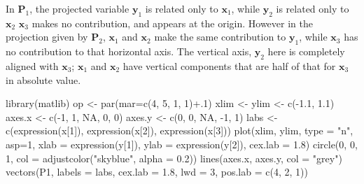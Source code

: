 \documentclass[
  letterpaper,
  10pt,
  krantz2]{krantz}
\makeatletter
\newenvironment{Shaded}{\begin{snugshade}}{\end{snugshade}}
\newcommand{\AttributeTok}[1]{\textcolor[rgb]{0.40,0.45,0.13}{#1}}
\newcommand{\ConstantTok}[1]{\textcolor[rgb]{0.56,0.35,0.01}{#1}}
\newcommand{\DecValTok}[1]{\textcolor[rgb]{0.68,0.00,0.00}{#1}}
\newcommand{\FloatTok}[1]{\textcolor[rgb]{0.68,0.00,0.00}{#1}}
\newcommand{\FunctionTok}[1]{\textcolor[rgb]{0.28,0.35,0.67}{#1}}
\newcommand{\NormalTok}[1]{\textcolor[rgb]{0.00,0.23,0.31}{#1}}
\newcommand{\OtherTok}[1]{\textcolor[rgb]{0.00,0.23,0.31}{#1}}
\newcommand{\SpecialCharTok}[1]{\textcolor[rgb]{0.37,0.37,0.37}{#1}}
\newcommand{\StringTok}[1]{\textcolor[rgb]{0.13,0.47,0.30}{#1}}
\newenvironment{kframe}{%
  \medskip{}
  \setlength{\fboxsep}{.8em}
  \def\at@end@of@kframe{}%
  \ifinner\ifhmode%
  \def\at@end@of@kframe{\end{minipage}}%
  \begin{minipage}{\columnwidth}%
  \fi\fi%
  \def\FrameCommand##1{\hskip\@totalleftmargin \hskip-\fboxsep
  \colorbox{shadecolor}{##1}\hskip-\fboxsep
      \hskip-\linewidth \hskip-\@totalleftmargin \hskip\columnwidth}%
  \MakeFramed {\advance\hsize-\width
    \@totalleftmargin\z@ \linewidth\hsize
    \@setminipage}}%
{\par\unskip\endMakeFramed%
  \at@end@of@kframe}
\renewenvironment{Shaded}{\begin{kframe}}{\end{kframe}}
\makeatother
\begin{document}
In \(\mathbf{P}_1\), the projected variable \(\mathbf{y}_1\) is related
only to \(\mathbf{x}_1\), while \(\mathbf{y}_2\) is related only to
\(\mathbf{x}_2\) \(\mathbf{x}_3\) makes no contribution, and appears at
the origin. However in the projection given by \(\mathbf{P}_2\),
\(\mathbf{x}_1\) and \(\mathbf{x}_2\) make the same contribution to
\(\mathbf{y}_1\), while \(\mathbf{x}_3\) has no contribution to that
horizontal axis. The vertical axis, \(\mathbf{y}_2\) here is completely
aligned with \(\mathbf{x}_3\); \(\mathbf{x}_1\) and \(\mathbf{x}_2\)
have vertical components that are half of that for \(\mathbf{x}_3\) in
absolute value.

\begin{Shaded}
\begin{Highlighting}[]
\FunctionTok{library}\NormalTok{(matlib)}
\NormalTok{op }\OtherTok{\textless{}{-}} \FunctionTok{par}\NormalTok{(}\AttributeTok{mar=}\FunctionTok{c}\NormalTok{(}\DecValTok{4}\NormalTok{, }\DecValTok{5}\NormalTok{, }\DecValTok{1}\NormalTok{, }\DecValTok{1}\NormalTok{)}\SpecialCharTok{+}\NormalTok{.}\DecValTok{1}\NormalTok{)}
\NormalTok{xlim }\OtherTok{\textless{}{-}}\NormalTok{ ylim }\OtherTok{\textless{}{-}} \FunctionTok{c}\NormalTok{(}\SpecialCharTok{{-}}\FloatTok{1.1}\NormalTok{, }\FloatTok{1.1}\NormalTok{)}
\NormalTok{axes.x }\OtherTok{\textless{}{-}} \FunctionTok{c}\NormalTok{(}\SpecialCharTok{{-}}\DecValTok{1}\NormalTok{, }\DecValTok{1}\NormalTok{, }\ConstantTok{NA}\NormalTok{, }\DecValTok{0}\NormalTok{, }\DecValTok{0}\NormalTok{)}
\NormalTok{axes.y }\OtherTok{\textless{}{-}} \FunctionTok{c}\NormalTok{(}\DecValTok{0}\NormalTok{, }\DecValTok{0}\NormalTok{, }\ConstantTok{NA}\NormalTok{, }\SpecialCharTok{{-}}\DecValTok{1}\NormalTok{, }\DecValTok{1}\NormalTok{)}
\NormalTok{labs }\OtherTok{\textless{}{-}} \FunctionTok{c}\NormalTok{(}\FunctionTok{expression}\NormalTok{(x[}\DecValTok{1}\NormalTok{]), }\FunctionTok{expression}\NormalTok{(x[}\DecValTok{2}\NormalTok{]), }\FunctionTok{expression}\NormalTok{(x[}\DecValTok{3}\NormalTok{]))}
\FunctionTok{plot}\NormalTok{(xlim, ylim, }\AttributeTok{type =} \StringTok{"n"}\NormalTok{, }\AttributeTok{asp=}\DecValTok{1}\NormalTok{,}
     \AttributeTok{xlab =} \FunctionTok{expression}\NormalTok{(y[}\DecValTok{1}\NormalTok{]), }\AttributeTok{ylab =} \FunctionTok{expression}\NormalTok{(y[}\DecValTok{2}\NormalTok{]),}
     \AttributeTok{cex.lab =} \FloatTok{1.8}\NormalTok{)}
\FunctionTok{circle}\NormalTok{(}\DecValTok{0}\NormalTok{, }\DecValTok{0}\NormalTok{, }\DecValTok{1}\NormalTok{, }\AttributeTok{col =} \FunctionTok{adjustcolor}\NormalTok{(}\StringTok{"skyblue"}\NormalTok{, }\AttributeTok{alpha =} \FloatTok{0.2}\NormalTok{))}
\FunctionTok{lines}\NormalTok{(axes.x, axes.y, }\AttributeTok{col =} \StringTok{"grey"}\NormalTok{)}
\FunctionTok{vectors}\NormalTok{(P1, }\AttributeTok{labels =}\NormalTok{ labs, }\AttributeTok{cex.lab =} \FloatTok{1.8}\NormalTok{, }\AttributeTok{lwd =} \DecValTok{3}\NormalTok{, }\AttributeTok{pos.lab =} \FunctionTok{c}\NormalTok{(}\DecValTok{4}\NormalTok{, }\DecValTok{2}\NormalTok{, }\DecValTok{1}\NormalTok{))}


\end{Highlighting}
\end{Shaded}
\end{document}
